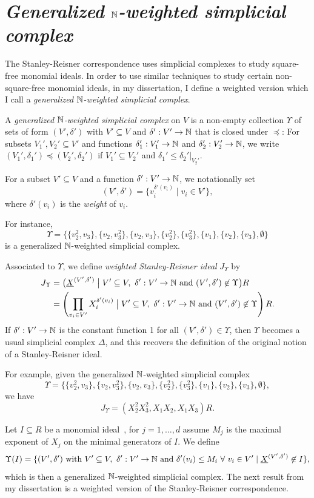 \documentclass{article}
\begin{document}
\section{\textsl{\large Generalized $\mathbb{N}$-weighted simplicial complex}} \label{section1}

    The Stanley-Reisner correspondence uses simplicial complexes to study square-free monomial ideals. In order to use similar techniques to study certain non-square-free monomial ideals, in my dissertation, I define a weighted version which I call a \emph{generalized $\mathbb{N}$-weighted simplicial complex}.

    A \emph{generalized $\mathbb{N}$-weighted simplicial complex} on $V$ is a non-empty collection $\Upsilon$ of sets of form $(V',\delta')$ with $V' \subseteq V$ and $\delta': V' \to \mathbb{N}$ that is closed under $\preccurlyeq$: For subsets $V_1',V_2' \subseteq V'$ and functions $\delta_1': V_1' \to \mathbb{N}$ and $\delta_2': V_2' \to \mathbb{N}$, we write $(V_1',\delta_1') \preccurlyeq (V_2',\delta_2')$ if $V_1' \subseteq V_2'$ and $\delta_1' \leq \delta_2'|_{V_2'}$. \par
    For a subset $V' \subseteq V$ and a function $\delta': V' \to \mathbb{N}$, we notationally set
    \[(V',\delta') = \{v_i^{\delta'(v_i)} \mid v_i \in V'\},\] 
    where $\delta'(v_i)$ is the \emph{weight} of $v_i$. \par
    For instance,
    \[\Upsilon = \{\{v_2^2,v_3\},\{v_2,v_3^2\},\{v_2,v_3\},\{v_2^2\},\{v_3^2\},\{v_1\},\{v_2\},\{v_3\},\emptyset\}\]
    is a generalized $\mathbb{N}$-weighted simplicial complex. \par
    Associated to $\Upsilon$, we define \emph{weighted Stanley-Reisner ideal} $J_{\Upsilon}$ by
\begin{align*}
    J_{\Upsilon} &= \bigl(\underline X^{(V',\delta')} \mathrel{\big |}V' \subseteq V, \ \delta': V' \to \mathbb{N} \text{ and }(V',\delta') \not\in \Upsilon\bigr)R \\
    &= \left(\prod_{v_i \in V'}X_i^{\delta'(v_i)} \mathrel{\big |}V' \subseteq V, \ \delta': V' \to \mathbb{N} \text{ and }(V',\delta') \not\in \Upsilon\right)R.
\end{align*}
If $\delta': V' \to \mathbb{N}$ is the constant function 1 for all $(V',\delta') \in \Upsilon$, then $\Upsilon$ becomes a usual simplicial complex $\Delta$, and this recovers the definition of the original notion of a Stanley-Reisner ideal. \par
    For example, given the generalized $\mathbb{N}$-weighted simplicial complex
    \[\Upsilon = \{\{v_2^2,v_3\},\{v_2,v_3^2\},\{v_2,v_3\},\{v_2^2\},\{v_3^2\},\{v_1\},\{v_2\},\{v_3\},\emptyset\},\]
    we have 
    \[ J_{\Upsilon} = (X_2^2X_3^2,X_1X_2,X_1X_3)R.\]
    \par Let $I \subseteq R$ be a monomial ideal~\cite{MR3839602}, for $j = 1,\dots,d$ assume $M_j$ is the maximal exponent of $X_j$ on the minimal generators of $I$. We define 
    \[\Upsilon(I) = \{(V',\delta') \text{ with }V' \subseteq V,\ \delta': V' \to \mathbb{N} \text{ and }\delta'(v_i) \leq M_i \ \forall \  v_i \in V' \mid \underline X^{(V',\delta')} \not\in I\},\]
    which is then a generalized $\mathbb{N}$-weighted simplicial complex. The next result from my dissertation is a weighted version of the Stanley-Reisner correspondence.
\end{document}
